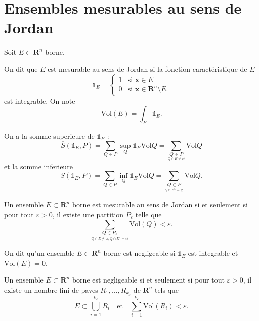 \section{Ensembles mesurables au sens de Jordan}
Soit $E\subset \mathbf{R}^{n}$ borne.
\begin{definition}
On dit que $E$ est mesurable au sens de Jordan si la fonction caractéristique de $E$ 
$$
\mathbb{1}_{E}=\begin{cases}
1 & \text{si }\boldsymbol{x}\in E \\
0 & \text{si }\boldsymbol{x}\in \mathbf{R}^{n}\setminus E.
\end{cases}
$$
est integrable. On note
$$
\mathrm{Vol}(E)=\int _{E}\mathbb{1}_{E}.
$$\end{definition}

On a la somme superieure de $\mathbb{1}_{E}$ :
$$
\overline{S}(\mathbb{1}_{E},P)=\sum _{Q\in P}\sup_{Q}\mathbb{1}_{E}\mathrm{Vol}Q=\sum _{\underset{Q\cap E\neq \varnothing}{Q\in P}} \mathrm{Vol}Q
$$
et la somme inferieure
$$
\underline{S}(\mathbb{1}_{E},P)=\sum _{Q\in P}\inf_{Q}\mathbb{1}_{E}\mathrm{Vol}Q=\sum _{\underset{Q\cap E^{\complement}=\varnothing}{Q\in P}}\mathrm{Vol}Q.
$$
\begin{lemma}
Un ensemble $E\subset \mathbf{R}^{n}$ borne est mesurable au sens de Jordan si et seulement si pour tout $\varepsilon>0$, il existe une partition $P_{\varepsilon}$ telle que 
$$
\sum _{\underset{Q\cap E\neq \varnothing,Q\cap E^{\complement}= \varnothing}{Q\in P_{\varepsilon}}}\mathrm{Vol}(Q)<\varepsilon.
$$
\end{lemma}
\begin{definition}
On dit qu'un ensemble $E\subset \mathbf{R}^{n}$ borne est negligeable si $\mathbb{1}_{E}$ est integrable et $\mathrm{Vol}(E)=0$.
\end{definition}
\begin{lemma}\label{lem811}
Un ensemble $E\subset \mathbf{R}^{n}$ borne est negligeable si et seulement si pour tout $\varepsilon>0$, il existe un nombre fini de paves $R_{1},\dots,R_{k_{\varepsilon}}$ de $\mathbf{R}^{n}$ tels que 
$$
E\subset \bigcup _{i=1}^{k_{\varepsilon}}R_{i}\quad\text{et}\quad\sum_{i=1}^{k_{\varepsilon}} \mathrm{Vol}(R_{i})<\varepsilon.
$$
\end{lemma}
